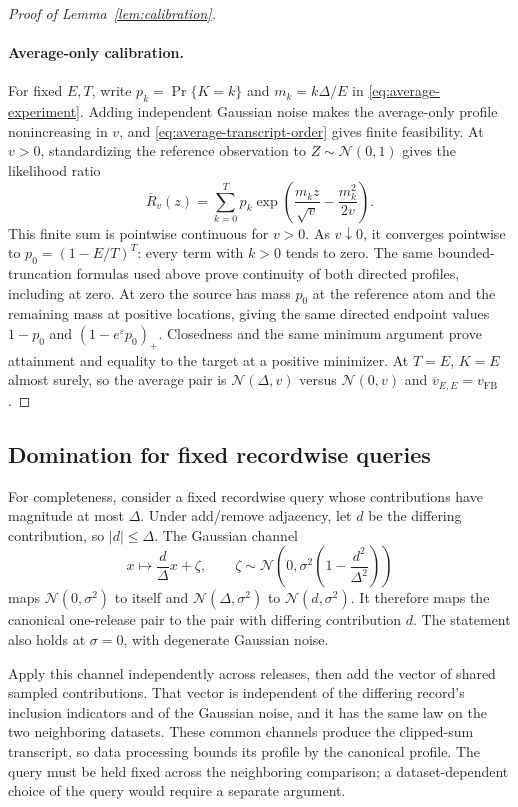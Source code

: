 \documentclass[11pt]{article}
\theoremstyle{remark}
\newcommand{\Normal}{\mathcal N}
\begin{document}
\begin{proof}[Proof of Lemma~\ref{lem:calibration}]
\paragraph{Average-only calibration.}
For fixed $E,T$, write $p_k=\Pr\{K=k\}$ and $m_k=k\Delta/E$ in
\eqref{eq:average-experiment}. Adding independent Gaussian noise makes the
average-only profile nonincreasing in $v$, and
\eqref{eq:average-transcript-order} gives finite feasibility. At $v>0$,
standardizing the reference observation to $Z\sim\Normal(0,1)$ gives the
likelihood ratio
\[
 \overline R_v(z)=\sum_{k=0}^T p_k
       \exp\!\left(\frac{m_kz}{\sqrt v}-\frac{m_k^2}{2v}\right).
\]
This finite sum is pointwise continuous for $v>0$. As $v\downarrow0$, it
converges pointwise to $p_0=(1-E/T)^T$: every term with $k>0$ tends to zero.
The same bounded-truncation formulas used above prove continuity of both
directed profiles, including at zero. At zero the source has mass $p_0$
at the reference atom and the remaining mass at positive locations, giving
the same directed endpoint values $1-p_0$ and $(1-e^\varepsilon p_0)_+$.
Closedness and the same minimum argument prove attainment and equality to
the target at a positive minimizer. At $T=E$, $K=E$ almost surely, so the
average pair is $\Normal(\Delta,v)$ versus $\Normal(0,v)$ and
$\overline v_{E,E}=v_{\mathrm{FB}}$.
\end{proof}

\subsection{Domination for fixed recordwise queries}\label{app:canonical-domination}
For completeness, consider a fixed recordwise query whose contributions
have magnitude at most $\Delta$. Under add/remove adjacency, let $d$ be the
differing contribution, so $|d|\leq\Delta$. The Gaussian channel
\[
 x\longmapsto\frac d\Delta x+\zeta,
 \qquad
 \zeta\sim\Normal\left(0,\sigma^2\left(1-\frac{d^2}{\Delta^2}\right)\right)
\]
maps $\Normal(0,\sigma^2)$ to itself and $\Normal(\Delta,\sigma^2)$ to
$\Normal(d,\sigma^2)$. It therefore maps the canonical one-release pair to
the pair with differing contribution $d$. The statement also holds at
$\sigma=0$, with degenerate Gaussian noise.

Apply this channel independently across releases, then add the vector of
shared sampled contributions. That vector is independent of the differing
record's inclusion indicators and of the Gaussian noise, and it has the
same law on the two neighboring datasets. These common channels produce
the clipped-sum transcript, so data processing bounds its profile by the
canonical profile. The query must be held fixed across the neighboring
comparison; a dataset-dependent choice of the query would require a
separate argument.
\end{document}
